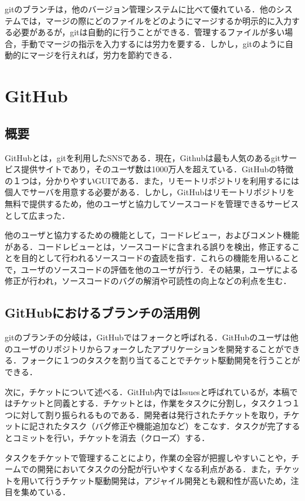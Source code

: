 \documentclass[a4j,9pt,twocolumn]{jsarticle}
\begin{document}
gitのブランチは，他のバージョン管理システムに比べて優れている．他のシステムでは，マージの際にどのファイルをどのようにマージするか明示的に入力する必要があるが，gitは自動的に行うことができる．管理するファイルが多い場合，手動でマージの指示を入力するには労力を要する．しかし，gitのように自動的にマージを行えれば，労力を節約できる．

\section{GitHub}
\subsection{概要}
GitHubとは，gitを利用したSNSである．現在，Githubは最も人気のあるgitサービス提供サイトであり，そのユーザ数は1000万人を超えている\cite{github}．GitHubの特徴の１つは，分かりやすいGUIである．また，リモートリポジトリを利用するには個人でサーバを用意する必要がある．しかし，GitHubはリモートリポジトリを無料で提供するため，他のユーザと協力してソースコードを管理できるサービスとして広まった．

他のユーザと協力するための機能として，コードレビュー，およびコメント機能がある．コードレビューとは，ソースコードに含まれる誤りを検出，修正することを目的として行われるソースコードの査読を指す．これらの機能を用いることで，ユーザのソースコードの評価を他のユーザが行う．その結果，ユーザによる修正が行われ，ソースコードのバグの解消や可読性の向上などの利点を生む．

\subsection{GitHubにおけるブランチの活用例}
gitのブランチの分岐は，GitHubではフォークと呼ばれる．GitHubのユーザは他のユーザのリポジトリからフォークしたアプリケーションを開発することができる．フォークに１つのタスクを割り当てることでチケット駆動開発を行うことができる．

次に，チケットについて述べる．GitHub内ではIssuesと呼ばれているが，本稿ではチケットと同義とする．チケットとは，作業をタスクに分割し，タスク１つ１つに対して割り振られるものである．開発者は発行されたチケットを取り，チケットに記されたタスク（バグ修正や機能追加など）をこなす．タスクが完了するとコミットを行い，チケットを消去（クローズ）する．

タスクをチケットで管理することにより，作業の全容が把握しやすいことや，チームでの開発においてタスクの分配が行いやすくなる利点がある．また，チケットを用いて行うチケット駆動開発は，アジャイル開発とも親和性が高いため，注目を集めている．
\end{document}

